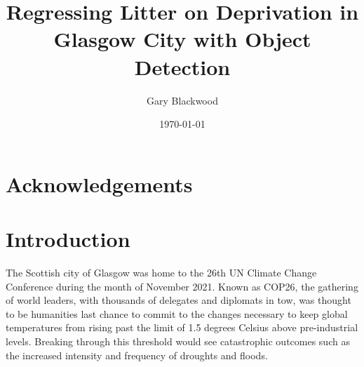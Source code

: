 \documentclass{thesis}
\begin{document}

\title{Regressing Litter on Deprivation in Glasgow City with Object Detection}
\author{Gary Blackwood}
\date{\today}
\maketitle


\begin{abstract}
\end{abstract}


\chapter*{Acknowledgements}


\listoffigures
\listoftables


\tableofcontents


\chapter{Introduction}

The Scottish city of Glasgow was home to the 26th UN Climate Change Conference during the month of November 2021. Known as COP26, the gathering of world leaders, with thousands of delegates and diplomats in tow, was thought to be humanities last chance to commit to the changes necessary to keep global temperatures from rising past the limit of 1.5 degrees Celsius above pre-industrial levels. Breaking through this threshold would see catastrophic outcomes such as the increased intensity and frequency of droughts and floods\cite{impacts-of-15}.
\end{document}

